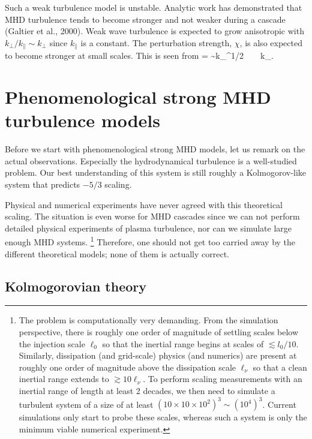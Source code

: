 \documentclass[usenatbib,twocolumn]{aastex63}
\begin{document}
Such a weak turbulence model is unstable.
Analytic work has demonstrated that MHD turbulence tends to become stronger and not weaker during a cascade (Galtier et al., 2000).
Weak wave turbulence is expected to grow anisotropic with $k_\perp/k_\parallel \sim k_\perp$ since $k_\parallel$ is a constant.
The perturbation strength, $\chi$, is also expected to become stronger at small scales.
This is seen from
\be
\chi =  \sim k_\perp^{1/2} \rightarrow \infty ~ ~ k_\perp \rightarrow \infty.
\ee



\section{Phenomenological strong MHD turbulence models}\label{sect:theory}

Before we start with phenomenological strong MHD models, let us remark on the actual observations.
Especially the hydrodynamical turbulence is a well-studied problem.
Our best understanding of this system is still roughly a Kolmogorov-like system that predicts $-5/3$ scaling.

Physical and numerical experiments have never agreed with this theoretical scaling.
The situation is even worse for MHD cascades since we can not perform detailed physical experiments of plasma turbulence, nor can we simulate large enough MHD systems.%
\footnote{
    The problem is computationally very demanding.
From the simulation perspective, there is roughly one order of magnitude of settling scales below the injection scale $\ell_0$ so that the inertial range begins at scales of $\lesssim l_0/10$.
Similarly, dissipation (and grid-scale) physics (and numerics) are present at roughly one order of magnitude above the dissipation scale $\ell_\nu$ so that a clean inertial range extends to $\gtrsim 10 \ell_\nu$.
To perform scaling measurements with an inertial range of length at least 2 decades, we then need to simulate a turbulent system of a size of at least $(10\times10\times10^2)^3 \sim (10^4)^3$.
Current simulations only start to probe these scales, whereas such a system is only the minimum viable numerical experiment.
}
Therefore, one should not get too carried away by the different theoretical models;
none of them is actually correct.


\subsection{Kolmogorovian theory}\label{sect:K41}
\end{document}
